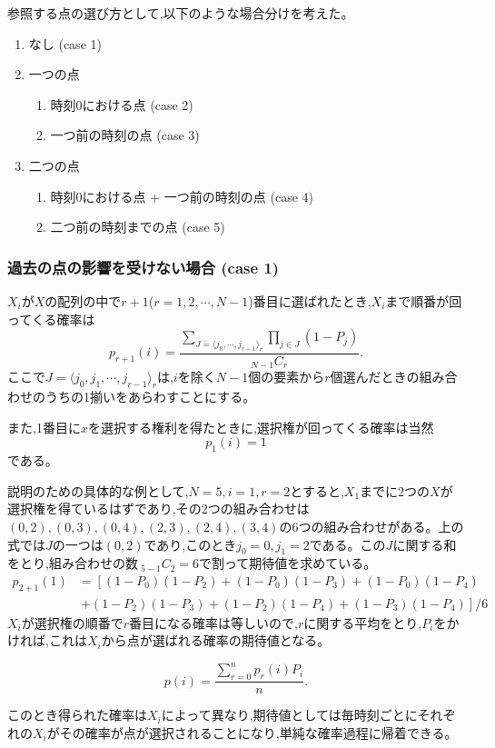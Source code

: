 参照する点の選び方として,以下のような場合分けを考えた。

\begin{enumerate}
    \item なし (case 1)
    \item 一つの点
    \begin{enumerate}
        \item 時刻0における点 (case 2)
        \item 一つ前の時刻の点 (case 3)
        \end{enumerate}
    \item 二つの点
    \begin{enumerate}
        \item 時刻0における点 + 一つ前の時刻の点 (case 4)
        \item 二つ前の時刻までの点 (case 5)
        \end{enumerate}
\end{enumerate}

\subsubsection{過去の点の影響を受けない場合 (case 1)}

$X_{i}$が$X$の配列の中で$r+1$($r = 1, 2, \cdots , N-1$)番目に選ばれたとき,$X_{i}$まで順番が回ってくる確率は
\[p_{r+1}(i) = \frac{\sum_{J = \langle j_{0}, \cdots ,j_{r-1} \rangle _{r}}\prod_{j\in J}(1-P_{j})}{_{N-1}C_{r}}.\]
ここで$J = \langle j_{0}, j_{1}, \cdots ,j_{r-1} \rangle_{r}$は,$i$を除く$N-1$個の要素から$r$個選んだときの組み合わせのうちの1揃いをあらわすことにする。

また,1番目に$x$を選択する権利を得たときに,選択権が回ってくる確率は当然
\[p_{1}(i) = 1\]
である。

説明のための具体的な例として,$N = 5, i = 1, r = 2$とすると,$X_{1}$までに2つの$X$が選択権を得ているはずであり,その2つの組み合わせは$(0,2), (0,3), (0,4), (2,3), (2,4), (3,4)$の6つの組み合わせがある。上の式では$J$の一つは$(0, 2)$であり,このとき$j_{0} = 0, j_{1} = 2$である。この$J$に関する和をとり,組み合わせの数$\ _{5-1}C_{2} = 6$で割って期待値を求めている。
\begin{align}
p_{2+1}(1) &= \left[(1-P_{0})(1-P_{2}) + (1-P_{0})(1-P_{3}) + (1-P_{0})(1-P_{4}) \right. \nonumber \\
&\ \left. + (1-P_{2})(1-P_{3}) + (1-P_{2})(1-P_{4}) + (1-P_{3})(1-P_{4}) \right]/6
\end{align}
$X_{i}$が選択権の順番で$r$番目になる確率は等しいので,$r$に関する平均をとり,$P_{i}$をかければ,これは$X_{i}$から点が選ばれる確率の期待値となる。

\[p(i) = \frac{\sum_{r=0}^{n}p_{r}(i)P_{i}}{n}.\]

このとき得られた確率は$X_{i}$によって異なり,期待値としては毎時刻ごとにそれぞれの$X_{i}$がその確率が点が選択されることになり,単純な確率過程に帰着できる。

